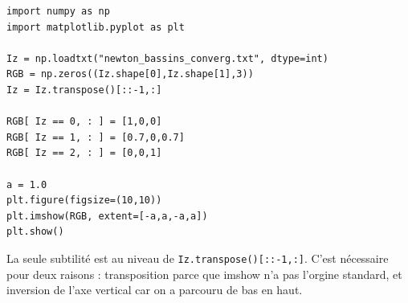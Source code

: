\documentclass{book}
\begin{document}
\begin{correction}
\begin{verbatim}
import numpy as np
import matplotlib.pyplot as plt

Iz = np.loadtxt("newton_bassins_converg.txt", dtype=int)
RGB = np.zeros((Iz.shape[0],Iz.shape[1],3))
Iz = Iz.transpose()[::-1,:]

RGB[ Iz == 0, : ] = [1,0,0]
RGB[ Iz == 1, : ] = [0.7,0,0.7]
RGB[ Iz == 2, : ] = [0,0,1]

a = 1.0
plt.figure(figsize=(10,10))
plt.imshow(RGB, extent=[-a,a,-a,a])
plt.show()
\end{verbatim}

La seule subtilité est au niveau de \texttt{Iz.transpose()[::-1,:]}. C'est nécessaire pour deux raisons : transposition parce que imshow n'a pas l'orgine standard, et inversion de l'axe vertical car on a parcouru de bas en haut.\\


\end{correction}
\end{document}
